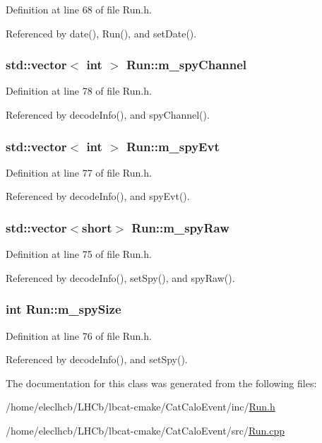 Definition at line 68 of file Run.h.

Referenced by date(), Run(), and setDate().\hypertarget{classRun_abe97602a3597cc941906069386a8d9aa}{
\subsubsection[{m\_\-spyChannel}]{\setlength{\rightskip}{0pt plus 5cm}std::vector$<$ int $>$ {\bf Run::m\_\-spyChannel}}}
\label{classRun_abe97602a3597cc941906069386a8d9aa}


Definition at line 78 of file Run.h.

Referenced by decodeInfo(), and spyChannel().\hypertarget{classRun_ae812e1695eafeb95fb54594047e98d95}{
\subsubsection[{m\_\-spyEvt}]{\setlength{\rightskip}{0pt plus 5cm}std::vector$<$ int $>$ {\bf Run::m\_\-spyEvt}}}
\label{classRun_ae812e1695eafeb95fb54594047e98d95}


Definition at line 77 of file Run.h.

Referenced by decodeInfo(), and spyEvt().\hypertarget{classRun_a825ab81f2a93f291878235dc13536688}{
\subsubsection[{m\_\-spyRaw}]{\setlength{\rightskip}{0pt plus 5cm}std::vector$<$short$>$ {\bf Run::m\_\-spyRaw}}}
\label{classRun_a825ab81f2a93f291878235dc13536688}


Definition at line 75 of file Run.h.

Referenced by decodeInfo(), setSpy(), and spyRaw().\hypertarget{classRun_a343bd5a0475c262da9b366933cf3a523}{
\subsubsection[{m\_\-spySize}]{\setlength{\rightskip}{0pt plus 5cm}int {\bf Run::m\_\-spySize}}}
\label{classRun_a343bd5a0475c262da9b366933cf3a523}


Definition at line 76 of file Run.h.

Referenced by decodeInfo(), and setSpy().

The documentation for this class was generated from the following files:\begin{DoxyCompactItemize}
\item 
/home/eleclhcb/LHCb/lbcat-\/cmake/CatCaloEvent/inc/\hyperlink{Run_8h}{Run.h}\item 
/home/eleclhcb/LHCb/lbcat-\/cmake/CatCaloEvent/src/\hyperlink{Run_8cpp}{Run.cpp}\end{DoxyCompactItemize}
